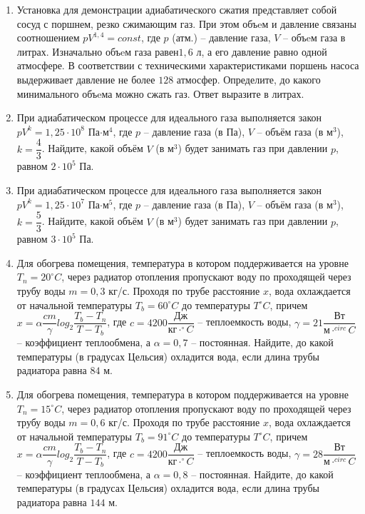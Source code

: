 \documentclass[12pt, a4paper]{article}
\begin{document}
\begin{enumerate}
		\item Установка для демонстрации адиабатического сжатия представляет собой сосуд с поршнем, резко сжимающим газ. При этом объeм и давление связаны соотношением \( pV^{1,4}=const\), где \( p \) (атм.) – давление газа, \( V \) – объeм газа в литрах. Изначально объeм газа равен\(  1,6 \) л, а его давление равно одной атмосфере. В соответствии с техническими характеристиками поршень насоса выдерживает давление не более \( 128 \) атмосфер. Определите, до какого минимального объeма можно сжать газ. Ответ выразите в литрах.
		\item При адиабатическом процессе для идеального газа выполняется закон \( pV^k=1,25 \cdot 10^8 \) Па\( \cdot \)м\( ^4 \), где \( p \) – давление газа (в Па), \( V \) – объём газа (в м\( ^3 \)), \( k=\dfrac{4}{3}\). Найдите, какой объём \( V \) (в м\( ^3 \)) будет занимать газ при давлении \( p \), равном \( 2 \cdot 10^5 \) Па.
		\item При адиабатическом процессе для идеального газа выполняется закон \( pV^k=1,25 \cdot 10^7 \) Па\( \cdot \)м\( ^5 \), где \( p \) – давление газа (в Па), \( V \) – объём газа (в м\( ^3 \)), \( k=\dfrac{5}{3}\). Найдите, какой объём \( V \) (в м\( ^3 \)) будет занимать газ при давлении \( p \), равном \( 3 \cdot 10^5 \) Па.
		\item Для обогрева помещения, температура в котором поддерживается на уровне \( T_n=20^{\circ}C \), через радиатор отопления пропускают воду по проходящей через трубу воды \( m=0,3 \) кг/с. Проходя по трубе расстояние \( x \), вода охлаждается от начальной температуры \( T_b=60^{\circ }C \) до температуры \( T^{\circ} C \), причем \( x=\alpha \dfrac{cm}{\gamma}log_2\dfrac{T_b-T_n}{T-T_b}\), где \( c=4200\dfrac{\text{Дж}}{кг \cdot ^{\circ}C} \) – теплоемкость воды, \( \gamma=21\dfrac{Вт}{м \cdot ^{circ}C} \) – коэффициент теплообмена, а \( \alpha =0,7 \) – постоянная. Найдите, до какой температуры (в градусах Цельсия) охладится вода, если длина трубы радиатора равна \(  84 \) м.
		\item Для обогрева помещения, температура в котором поддерживается на уровне \( T_n=15^{\circ}C \), через радиатор отопления пропускают воду по проходящей через трубу воды \( m=0,6 \) кг/с. Проходя по трубе расстояние \( x \), вода охлаждается от начальной температуры \( T_b=91^{\circ }C \) до температуры \( T^{\circ} C \), причем \( x=\alpha \dfrac{cm}{\gamma}log_2\dfrac{T_b-T_n}{T-T_b}\), где \( c=4200\dfrac{Дж}{кг \cdot ^{\circ}C} \) – теплоемкость воды, \( \gamma=28\dfrac{Вт}{м \cdot ^{circ}C} \) – коэффициент теплообмена, а \( \alpha =0,8 \) – постоянная. Найдите, до какой температуры (в градусах Цельсия) охладится вода, если длина трубы радиатора равна \(  144 \) м.

\end{enumerate}
\end{document}

